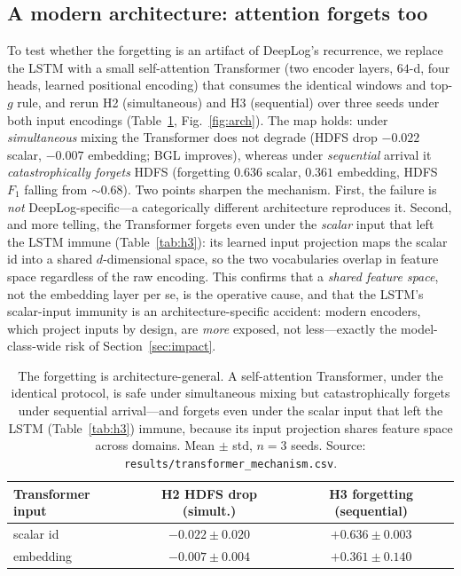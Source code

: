 \documentclass[journal]{IEEEtran}
\begin{document}
\subsection{A modern architecture: attention forgets too}\label{sec:arch}
To test whether the forgetting is an artifact of DeepLog's recurrence, we replace the LSTM with a
small self-attention Transformer (two encoder layers, $64$-d, four heads, learned positional encoding)
that consumes the identical windows and top-$g$ rule, and rerun H2 (simultaneous) and H3 (sequential)
over three seeds under both input encodings (Table~\ref{tab:arch}, Fig.~\ref{fig:arch}). The map holds: under
\emph{simultaneous} mixing the Transformer does not degrade (HDFS drop $-0.022$ scalar, $-0.007$
embedding; BGL improves), whereas under \emph{sequential} arrival it \emph{catastrophically forgets}
HDFS (forgetting $0.636$ scalar, $0.361$ embedding, HDFS $F_1$ falling from ${\sim}0.68$). Two points
sharpen the mechanism. First, the failure is \emph{not} DeepLog-specific---a categorically different
architecture reproduces it. Second, and more telling, the Transformer forgets even under the
\emph{scalar} input that left the LSTM immune (Table~\ref{tab:h3}): its learned input projection maps
the scalar id into a shared $d$-dimensional space, so the two vocabularies overlap in feature space
regardless of the raw encoding. This confirms that a \emph{shared feature space}, not the embedding
layer per se, is the operative cause, and that the LSTM's scalar-input immunity is an
architecture-specific accident: modern encoders, which project inputs by design, are \emph{more}
exposed, not less---exactly the model-class-wide risk of Section~\ref{sec:impact}.

\begin{table}[t]
\caption{The forgetting is architecture-general. A self-attention Transformer, under the identical
protocol, is safe under simultaneous mixing but catastrophically forgets under sequential arrival---and
forgets even under the scalar input that left the LSTM (Table~\ref{tab:h3}) immune, because its input
projection shares feature space across domains. Mean $\pm$ std, $n=3$ seeds.
Source: \texttt{results/transformer\_mechanism.csv}.}
\label{tab:arch}
\centering
\begin{tabular}{@{}lcc@{}}
\toprule
Transformer input & H2 HDFS drop (simult.) & H3 forgetting (sequential) \\
\midrule
scalar id  & $-0.022\pm0.020$ & $\mathbf{+0.636\pm0.003}$ \\
embedding  & $-0.007\pm0.004$ & $\mathbf{+0.361\pm0.140}$ \\
\bottomrule
\end{tabular}
\end{table}
\end{document}
